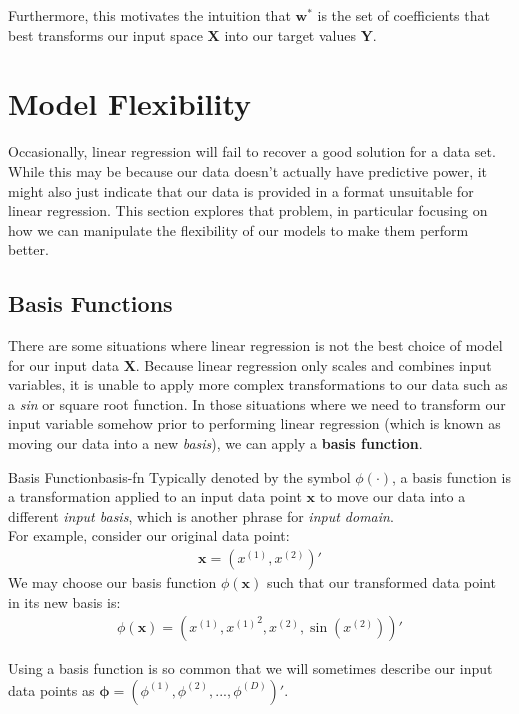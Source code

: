 Furthermore, this motivates the intuition that $\textbf{w}^{*}$ is the set of coefficients that best transforms our input space $\textbf{X}$ into our target values $\textbf{Y}$.

\section{Model Flexibility}
Occasionally, linear regression will fail to recover a good solution for a data set. While this may be because our data doesn't actually have predictive power, it might also just indicate that our data is provided in a format unsuitable for linear regression. This section explores that problem, in particular focusing on how we can manipulate the flexibility of our models to make them perform better.

\subsection{Basis Functions}
There are some situations where linear regression is not the best choice of model for our input data $\textbf{X}$. Because linear regression only scales and combines input variables, it is unable to apply more complex transformations to our data such as a \textit{sin} or square root function. In those situations where we need to transform our input variable somehow prior to performing linear regression (which is known as moving our data into a new \textit{basis}), we can apply a \textbf{basis function}.

\begin{definition}{Basis Function}{basis-fn}
    Typically denoted by the symbol $\phi(\cdot)$, a basis function is a transformation applied to an input data point $\textbf{x}$ to move our data into a different \textit{input basis}, which is another phrase for \textit{input domain}. \\

    For example, consider our original data point:
    \begin{align*}
    \textbf{x} = (x^{(1)}, x^{(2)})'
    \end{align*}
    We may choose our basis function $\phi(\textbf{x})$ such that our transformed data point in its new basis is:
    \begin{align*}
        \phi(\textbf{x}) = (x^{(1)}, {x^{(1)}}^2, x^{(2)}, \sin(x^{(2)}))'
    \end{align*}

    Using a basis function is so common that we will sometimes describe our input data points as $\boldsymbol{\phi} = (\phi^{(1)}, \phi^{(2)}, ..., \phi^{(D)})'$.
\end{definition}

